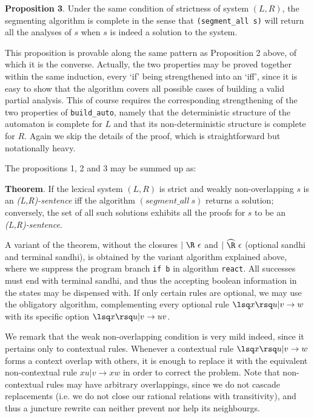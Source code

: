 \noindent
{\bf Proposition 3}. Under the same condition of strictness of system $(L,R)$,
the segmenting algorithm is complete in the sense that 
\verb:(segment_all s): will return all the analyses of $s$ when $s$ is 
indeed a solution to the system. 

This proposition is provable along the same pattern as Proposition 2 above, of
which it is the converse. Actually, the two properties may be proved together
within the same induction, every `if' being strengthened into an
`iff', since it is easy to show that the algorithm covers all possible cases
of building a valid partial analysis. This of course requires the 
corresponding strengthening of the two properties of \verb:build_auto:, namely
that the deterministic structure of the automaton is complete for $L$ and that
its non-deterministic structure is complete for $R$. Again we skip the details
of the proof, which is straightforward but notationally heavy. 

The propositions 1, 2 and 3 may be summed up as:

\noindent
{\bf Theorem}. If the lexical system $(L,R)$ is strict and weakly
non-overlapping
$s$ is an {\sl (L,R)-sentence} iff the algorithm $(segment\_all~s)$ 
returns a solution; conversely, the set of all such solutions exhibits
all the proofs for $s$ to be an {\sl (L,R)-sentence}.

A variant of the theorem, without the closures $|~{\R}~\epsilon$
and $|~{\widehat{\R}}~\epsilon$ (optional sandhi and terminal sandhi), 
is obtained by the variant algorithm explained above, where we
suppress the program branch \verb:if b: in algorithm
\verb:react:. All successes must end with terminal sandhi, and thus the
accepting boolean information in the states may be dispensed with.
If only certain rules are optional, we may use the obligatory algorithm,
complementing every optional rule $\lsq x\rsq u|v\rightarrow w$ with
its specific option $\lsq x\rsq u|v\rightarrow uv$. 

We remark that the weak
non-overlapping condition is very mild indeed, since it pertains 
only to contextual rules. Whenever a contextual rule 
$\lsq x\rsq u|v\rightarrow w$ forms a context overlap with others,
it is enough to replace it with the equivalent non-contextual
rule $xu|v\rightarrow xw$ in order to correct the problem. Note that
non-contextual rules may have arbitrary overlappings, since
we do not cascade replacements (i.e. we do not close our
rational relations with transitivity), and thus a juncture rewrite can
neither prevent nor help its neighbourgs. 

